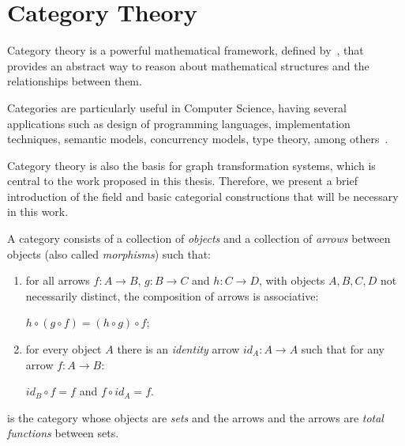 \chapter{Category Theory}\label{app:category-theory}

Category theory is a powerful mathematical framework, defined by~\cite{Eilenberg1945}, that provides an abstract way to reason about mathematical structures and the relationships between them.

Categories are particularly useful in Computer Science, having several applications such as design of programming languages, implementation techniques, semantic models, concurrency models, type theory, among others~\cite{Pierce1991}.

Category theory is also the basis for graph transformation systems, which is central to the work proposed in this thesis. Therefore, we present a brief introduction of the field and basic categorial constructions that will be necessary in this work.

\begin{definition}[Category]\label{def:category} A category  consists of a collection of \emph{objects} and a collection of \emph{arrows} between objects (also called \emph{morphisms}) such that:

  \begin{enumerate}
    \item for all arrows $f : A \rightarrow B$, $g : B \rightarrow C$ and
$h : C \rightarrow D$, with objects $A,B,C,D$ not necessarily distinct, the composition of arrows is associative:

  $h \circ (g \circ f) = (h \circ g) \circ f$;
    \item for every object $A$ there is an \emph{identity} arrow $id_A : A \rightarrow A$ such that for any arrow $f : A \rightarrow B$:

  $id_B \circ f = f$ and $f \circ id_A = f$.
  \end{enumerate}
\end{definition}

\begin{example}  is the category whose objects are \emph{sets} and the arrows and the arrows are \emph{total functions} between sets. 
\end{example}

